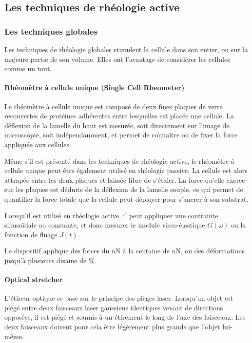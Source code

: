\documentclass{report}
\begin{document}
\subsection{Les techniques de rhéologie active}
\subsubsection{Les techniques globales}
Les techniques de rhéologie globales stimulent la cellule dans son entier, ou sur la majeure partie de son volume. Elles ont l'avantage de considérer les cellules comme un tout. 

\paragraph{Rhéomètre à cellule unique (Single Cell Rheometer)}

Le rhéomètre à cellule unique est composé de deux fines plaques de verre recouvertes de protéines adhérentes entre lesquelles est placée une cellule. 
La déflexion de la lamelle du haut est mesurée, soit directement sur l'image de microscopie, soit indépendamment, et permet de connaître ou de fixer la force appliquée aux cellules. 

Même s'il est présenté dans les techniques de rhéologie active, le rhéomètre à cellule unique peut être également utilisé en rhéologie passive. 
La cellule est alors attrapée entre les deux plaques et laissée libre de s'étaler. La force qu'elle exerce sur les plaques est déduite de la déflexion de la lamelle souple, ce qui permet de quantifier la force totale que la cellule peut déployer pour s'ancrer à son substrat. 

Lorsqu'il est utilisé en rhéologie active, il peut appliquer une contrainte sinusoïdale ou constante, et donc mesurer le module visco-élastique $G(\omega)$ ou la fonction de fluage $J(t)$. 

Le dispositif applique des forces du nN à la centaine de nN, ou des déformations jusqu'à plusieurs dizaine de \%. 



\paragraph{Optical stretcher}

L'étireur optique se base sur le principe des pièges laser.
Lorsqu'un objet est piégé entre deux faisceaux laser gaussiens identiques venant de directions opposées, il est piégé et soumis à un étirement le long de l'axe des faisceaux. 
Les deux faisceaux doivent pour cela être légèrement plus grands que l'objet lui-même. 
\end{document}
